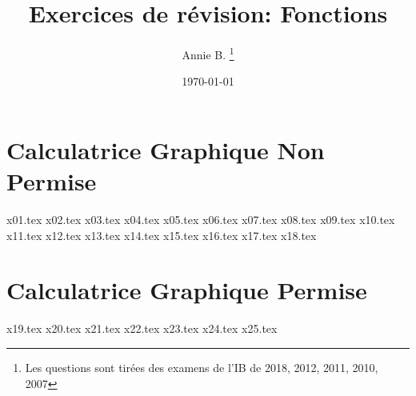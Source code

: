 \documentclass[10pt]{article}
\newcounter{question}
\begin{document}
 

\title{Exercices de révision: Fonctions}
\author{Annie B. \thanks{Les questions sont tirées des examens de l’IB de 2018, 2012, 2011, 2010, 2007}}
\date{\today}
\maketitle

\newpage
\section*{\textbf{Calculatrice Graphique Non Permise}}
{x01.tex}
\newpage
{x02.tex}
\bigskip
{x03.tex}
\newpage
{x04.tex}
\bigskip
{x05.tex}
\bigskip
{x06.tex}
\newpage
{x07.tex}
\bigskip
{x08.tex}
\newpage
{x09.tex}
\newpage
{x10.tex}
\bigskip
{x11.tex}
\bigskip
{x12.tex}
\bigskip
{x13.tex}
\newpage
{x14.tex}
\bigskip
{x15.tex}
\bigskip
{x16.tex}
\bigskip
{x17.tex}
\bigskip
{x18.tex}
\bigskip
\section*{\textbf{Calculatrice Graphique Permise}}
{x19.tex}
\newpage
{x20.tex}
\bigskip
{x21.tex}
\bigskip
{x22.tex}
\newpage
{x23.tex}
\bigskip
{x24.tex}
\bigskip
{x25.tex}
\end{document}
